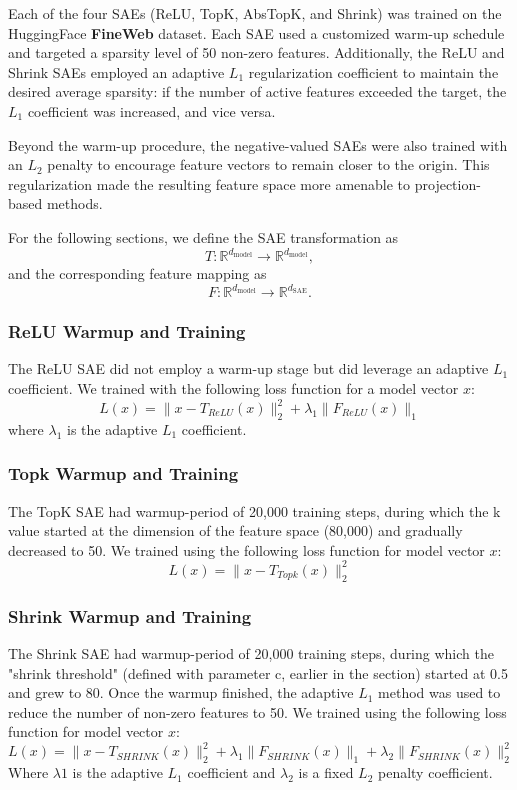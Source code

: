 \documentclass{article}
\begin{document}
Each of the four SAEs (ReLU, TopK, AbsTopK, and Shrink) was trained on the HuggingFace \textbf{FineWeb} dataset. Each SAE used a customized warm-up schedule and targeted a sparsity level of 50 non-zero features. Additionally, the ReLU and Shrink SAEs employed an adaptive $L_1$ regularization coefficient to maintain the desired average sparsity: if the number of active features exceeded the target, the $L_1$ coefficient was increased, and vice versa.

Beyond the warm-up procedure, the negative-valued SAEs were also trained with an $L_2$ penalty to encourage feature vectors to remain closer to the origin. This regularization made the resulting feature space more amenable to projection-based methods.

For the following sections, we define the SAE transformation as
\[
T : \mathbb{R}^{d_{\mathrm{model}}} \rightarrow \mathbb{R}^{d_{\mathrm{model}}},
\]
and the corresponding feature mapping as
\[
F : \mathbb{R}^{d_{\mathrm{model}}} \rightarrow \mathbb{R}^{d_{\mathrm{SAE}}}.
\]

\subsubsection{ReLU Warmup and Training}
    The ReLU SAE did not employ a warm-up stage but did leverage an adaptive $L_1$ coefficient. We trained with the following loss function for a model vector $x$:
    $$
    L(x) = \|x - T_{ReLU}(x)\|_2^2 + \lambda_1\|F_{ReLU}(x)\|_1
    $$
    where $\lambda_1$ is the adaptive $L_1$ coefficient.
    
\subsubsection{Topk Warmup and Training}
    The TopK SAE had warmup-period of 20,000 training steps, during which the k value started at the dimension of the feature space (80,000) and gradually decreased to 50. We trained using the following loss function for model vector $x$:
    $$
    L(x) = \|x - T_{Topk}(x)\|_2^2
    $$

\subsubsection{Shrink Warmup and Training}
    The Shrink SAE had warmup-period of 20,000 training steps, during which the "shrink threshold" (defined with parameter c, earlier in the section) started at 0.5 and grew to 80. Once the warmup finished, the adaptive $L_1$ method was used to reduce the number of non-zero features to 50. We trained using the following loss function for model vector $x$:
    $$
    L(x) = \|x - T_{SHRINK}(x)\|_2^2 + \lambda_1\|F_{SHRINK}(x)\|_1 + \lambda_2 \|F_{SHRINK}(x)\|_2^2
    $$
    Where $\lambda 1$ is the adaptive $L_1$ coefficient and $\lambda_2$ is a fixed $L_2$ penalty coefficient.
    
\end{document}
